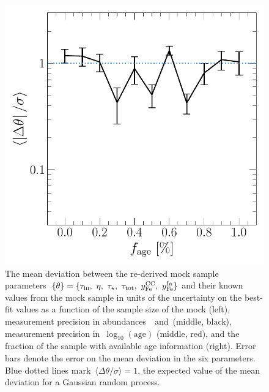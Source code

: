 \documentclass[ms.tex]{subfiles}
\begin{document}
\begin{figure}
\includegraphics[scale = 0.45]{dp_sigma_agefrac.pdf}
\caption{
The mean deviation between the re-derived mock sample parameters~$\{\theta\} =
\{\tau_\text{in},~\eta,~\tau_\star,~\tau_\text{tot},~y_\text{Fe}^\text{CC},~y_\text{Fe}^\text{Ia}\}$ and
their known values from the mock sample in units of the uncertainty on the
best-fit values as a function of the sample size of the mock (left),
measurement precision in abundances~\feh~and~\afe (middle, black),
measurement precision in~$\log_{10}(\text{age})$ (middle, red),
and the fraction of the sample with available age information (right).
Error bars denote the error on the mean deviation in the six parameters.
Blue dotted lines mark~$\langle\Delta\theta/\sigma\rangle = 1$, the
expected value of the mean deviation for a Gaussian random process.
}
\label{fig:dp_sigma}
\end{figure}


\end{document}

